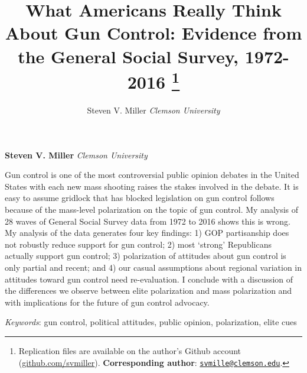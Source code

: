 \documentclass[11pt,]{article}
\title{What Americans Really Think About Gun Control: Evidence from the General
Social Survey, 1972-2016 \thanks{Replication files are available on the author's Github account
(\href{https://github.com/svmiller}{github.com/svmiller}).
\textbf{Corresponding author}:
\href{mailto:svmille@clemson.edu}{\nolinkurl{svmille@clemson.edu}}.}  }
\author{\Large Steven V. Miller\vspace{0.05in} \newline\normalsize\emph{Clemson University}  }
\date{}
\newcommand*{\authorfont}{\fontfamily{phv}\selectfont}
\renewenvironment{abstract}
 {{%
    \setlength{\leftmargin}{0mm}
    \setlength{\rightmargin}{\leftmargin}%
  }%
  \relax}
 {\endlist}
\begin{document}
	
%

{%
\setlength{\parindent}{0pt}
\thispagestyle{plain}
{\fontsize{18}{20}\selectfont\raggedright 
\maketitle  %

}

{
   \vskip 13.5pt\relax \normalsize\fontsize{11}{12} 
\textbf{\authorfont Steven V. Miller} \hskip 15pt \emph{\small Clemson University}   

}

}








\begin{abstract}

    \hbox{\vrule height .2pt width 39.14pc}

    \vskip 8.5pt %

\noindent Gun control is one of the most controversial public opinion debates in
the United States with each new mass shooting raises the stakes involved
in the debate. It is easy to assume gridlock that has blocked
legislation on gun control follows because of the mass-level
polarization on the topic of gun control. My analysis of 28 waves of
General Social Survey data from 1972 to 2016 shows this is wrong. My
analysis of the data generates four key findings: 1) GOP partisanship
does not robustly reduce support for gun control; 2) most `strong'
Republicans actually support gun control; 3) polarization of attitudes
about gun control is only partial and recent; and 4) our casual
assumptions about regional variation in attitudes toward gun control
need re-evaluation. I conclude with a discussion of the differences we
observe between elite polarization and mass polarization and with
implications for the future of gun control advocacy.


\vskip 8.5pt \noindent \emph{Keywords}: gun control, political attitudes, public opinion, polarization, elite
cues \par

    \hbox{\vrule height .2pt width 39.14pc}



\end{abstract}
\end{document}
